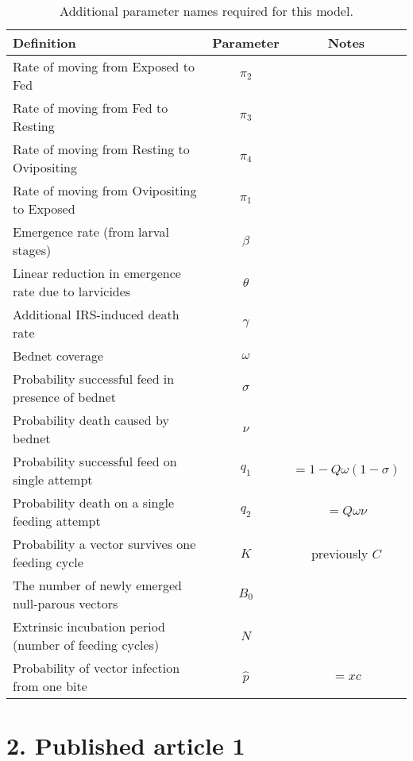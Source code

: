 \begin{table*}[h!]
\caption{Additional parameter names required for this model.}%
\vspace{.1cm}
\centering %
\begin{tabular}{l c c}%
\hline\hline                        %
Definition & Parameter & Notes \\ [0.5ex]%
\hline                  %
Rate of moving from Exposed to Fed & $\pi_2$ & \\
Rate of moving from Fed to Resting & $\pi_3$ & \\
Rate of moving from Resting to Ovipositing & $\pi_4$ & \\
Rate of moving from Ovipositing to Exposed & $\pi_1$ & \\
Emergence rate (from larval stages) & $\beta$ & \\
Linear reduction in emergence rate due to larvicides & $\theta$ & \\
Additional IRS-induced death rate & $\gamma$ & \\
Bednet coverage & $\omega$ & \\
Probability successful feed in presence of bednet & $\sigma$ & \\
Probability death caused by bednet & $\nu$ & \\
Probability successful feed on single attempt & $q_1$ & $=1-Q\omega(1-\sigma)$ \\
Probability death on a single feeding attempt & $q_2$ & $=Q\omega\nu$\\
Probability a vector survives one feeding cycle & $K$ & previously $C$\\
The number of newly emerged null-parous vectors & $B_0$ &\\
Extrinsic incubation period (number of feeding cycles) & $N$ & \\
Probability of vector infection from one bite & $\hat{p}$ & $=xc$ \\
\hline%
\end{tabular}
\label{table:param2}%
\end{table*}

\FloatBarrier

\section*{2. Published article 1}

